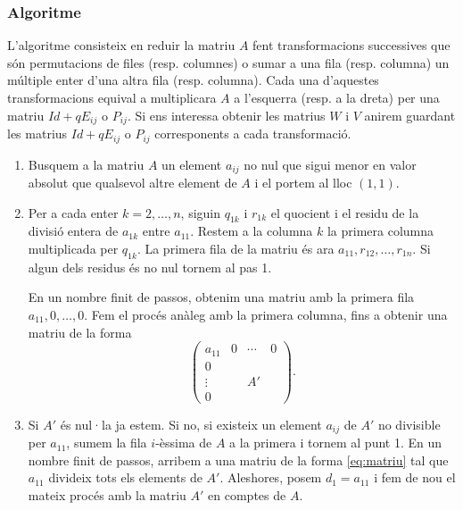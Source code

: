\documentclass[../main.tex]{subfiles}
\begin{document}
\subsubsection{Algoritme}
L'algoritme consisteix en reduir la matriu $A$ fent transformacions successives que són permutacions de files (resp. columnes) o sumar a una fila (resp. columna) un múltiple enter d'una altra fila (resp. columna). Cada una d'aquestes transformacions equival a multiplicara $A$ a l'esquerra (resp. a la dreta) per una matriu $Id+qE_{ij}$ o $P_{ij}$. Si ens interessa obtenir les matrius $W$ i $V$ anirem guardant les matrius $Id+qE_{ij}$ o $P_{ij}$ corresponents a cada transformació.
\begin{enumerate}
    \item Busquem a la matriu $A$ un element $a_{ij}$ no nul que sigui menor en valor absolut que qualsevol altre element de $A$ i el portem al lloc $(1,1)$.
    \item Per a cada enter $k = 2,\ldots, n$, siguin $q_{1k}$ i $r_{1k}$ el quocient i el residu de la divisió entera de $a_{1k}$ entre $a_{11}$. Restem a la columna $k$ la primera columna multiplicada per $q_{1k}$. La primera fila de la matriu és ara $a_{11}, r_{12},\ldots,r_{1n}$. Si algun dels residus és no nul tornem al pas 1.
    
    En un nombre finit de passos, obtenim una matriu amb la primera fila $a_{11},0,\ldots,0$. Fem el procés anàleg amb la primera columna, fins a obtenir una matriu de la forma
    \begin{equation}
        \label{eq:matriu}
        \begin{pmatrix}
            a_{11} & 0 & \cdots & 0 \\
            0 & & & \\
            \vdots & & A' & \\
            0 & & & 
        \end{pmatrix}.
    \end{equation}
    \item Si $A'$ és nul·la ja estem. Si no, si existeix un element $a_{ij}$ de $A'$ no divisible per $a_{11}$, sumem la fila $i$-èssima de $A$ a la primera i tornem al punt 1. En un nombre finit de passos, arribem a una matriu de la forma \ref{eq:matriu} tal que $a_{11}$ divideix tots els elements de $A'$. Aleshores, posem $d_1 = a_{11}$ i fem de nou el mateix procés amb la matriu $A'$ en comptes de $A$.
\end{enumerate}
\end{document}
